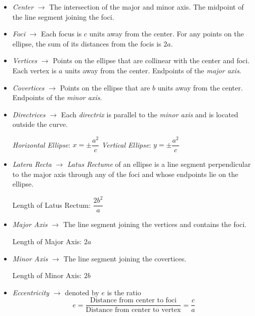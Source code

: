 \documentclass[a4paper]{article}
\theoremstyle{definition}
\begin{document}
\begin{itemize}
    \item \emph{Center} $\rightarrow$ The intersection of the major and minor
        axis. The midpoint of the line segment joining the foci.
    \item \emph{Foci} $\rightarrow$ Each focus is $c$ units away from the
        center. For any points on the ellipse,  the sum of its distances from
        the focis is $2a$.
    \item \emph{Vertices} $\rightarrow$ Points on the ellipse that are collinear
        with the center and foci. Each vertex is $a$ units away from the center.
        Endpoints of the \emph{major axis}.  
    \item \emph{Covertices} $\rightarrow$ Points on the ellipse that are $b$
        units away from the center. Endpoints of the \emph{minor axis}.
    \item \emph{Directrices} $\rightarrow$ Each \emph{directrix} is parallel to
         the \emph{minor axis} and is located outside the curve. 
        \begin{center}
            \emph{Horizontal Ellipse}: $x=\pm \dfrac{a^2}{c}$ \qquad
            \emph{Vertical Ellipse}: $y=\pm \dfrac{a^2}{c}$
        \end{center}
    \item \emph{Latera Recta} $\rightarrow$ \emph{Latus Rectume} of an ellipse
        is a line segment perpendicular to the major axis through any of the
        foci and whose endpoints lie on the ellipse.
        \begin{center}
             Length of Latus Rectum: $\dfrac{2b^2}{a}$
        \end{center}
    \item \emph{Major Axis} $\rightarrow$ The line segment joining the vertices
        and contains the foci.
        \begin{center}
             Length of Major Axis: $2a$
        \end{center}
    \item \emph{Minor Axis} $\rightarrow$ The line segment joining the
            covertices.
            \begin{center}
                 Length of Minor Axis: $2b$
            \end{center}
    \item \emph{Eccentricity} $\rightarrow$ denoted by $e$ is the ratio
            \begin{equation*}
                 e = \dfrac{\text{Distance from center to foci}}
                 {\text{Distance from center to vertex}} = \dfrac{c}{a}
            \end{equation*}
\end{itemize}
\newpage
\end{document}
